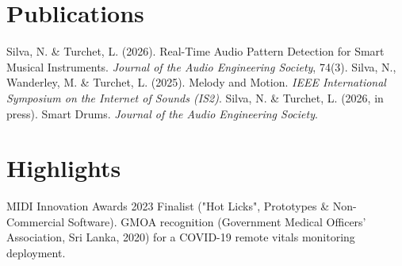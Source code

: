 \documentclass[11pt]{article}
\begin{document}
\section*{Publications}
Silva, N. \& Turchet, L. (2026). Real-Time Audio Pattern Detection for Smart Musical Instruments. \textit{Journal of the Audio Engineering Society}, 74(3). Silva, N., Wanderley, M. \& Turchet, L. (2025). Melody and Motion. \textit{IEEE International Symposium on the Internet of Sounds (IS2)}. Silva, N. \& Turchet, L. (2026, in press). Smart Drums. \textit{Journal of the Audio Engineering Society}.

\section*{Highlights}
MIDI Innovation Awards 2023 Finalist ("Hot Licks", Prototypes \& Non-Commercial Software). GMOA recognition (Government Medical Officers' Association, Sri Lanka, 2020) for a COVID-19 remote vitals monitoring deployment.
\end{document}
